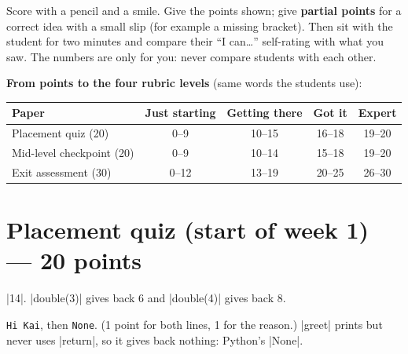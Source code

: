 
\begin{teachernote}
Score with a pencil and a smile. Give the points shown; give \textbf{partial points} for a correct
idea with a small slip (for example a missing bracket). Then sit with the student for two minutes
and compare their \enquote{I can\ldots} self-rating with what you saw. The numbers are only for
you: never compare students with each other.
\end{teachernote}

\textbf{From points to the four rubric levels} (same words the students use):

\begin{center}
\renewcommand{\arraystretch}{1.3}
\begin{tabular}{@{}lcccc@{}}
\toprule
\rowcolor{kcaccent!15} Paper & Just starting & Getting there & Got it & Expert\\ \midrule
Placement quiz (20) & 0--9 & 10--15 & 16--18 & 19--20\\
Mid-level checkpoint (20) & 0--9 & 10--14 & 15--18 & 19--20\\
Exit assessment (30) & 0--12 & 13--19 & 20--25 & 26--30\\
\bottomrule
\end{tabular}
\end{center}

\section{Placement quiz (start of week 1) --- 20 points}

\begin{answer}
\py|14|. \py|double(3)| gives back 6 and \py|double(4)| gives back 8.
\end{answer}

\begin{answer}
\texttt{Hi Kai}, then \texttt{None}. (1 point for both lines, 1 for the reason.) \py|greet| prints
but never uses \py|return|, so it gives back nothing: Python's \py|None|.
\end{answer}

